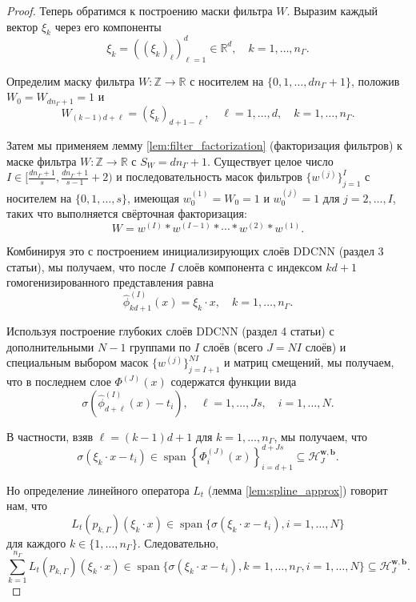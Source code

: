 \documentclass[../NDCNNAI_main.tex]{subfiles}
\begin{document}
\begin{proof}
    Теперь обратимся к построению маски фильтра $W$. Выразим каждый вектор $\xi_k$ через его компоненты
    \[
    \xi_k = ((\xi_k)_\ell)_{\ell=1}^d \in \mathbb{R}^d, \quad k = 1, \ldots, n_\Gamma.
    \]

    Определим маску фильтра $W : \mathbb{Z} \to \mathbb{R}$ с носителем на $\{0, 1, \ldots, dn_\Gamma + 1\}$, положив $W_0 = W_{dn_\Gamma + 1} = 1$ и
    \[
    W_{(k-1)d+\ell} = (\xi_k)_{d+1-\ell}, \quad \ell = 1, \ldots, d, \quad k = 1, \ldots, n_\Gamma.
    \]

    Затем мы применяем лемму \ref{lem:filter_factorization} (факторизация фильтров) к маске фильтра $W : \mathbb{Z} \to \mathbb{R}$ с $S_W = dn_\Gamma + 1$. Существует целое число $I \in [\frac{dn_\Gamma + 1}{s}, \frac{dn_\Gamma + 1}{s-1} + 2)$ и последовательность масок фильтров $\{w^{(j)}\}_{j=1}^I$ с носителем на $\{0, 1, \ldots, s\}$, имеющая $w_0^{(1)} = W_0 = 1$ и $w_0^{(j)} = 1$ для $j = 2, \ldots, I$, таких что выполняется свёрточная факторизация:
    \[
    W = w^{(I)} * w^{(I-1)} * \cdots * w^{(2)} * w^{(1)}.
    \]

    Комбинируя это с построением инициализирующих слоёв DDCNN (раздел 3 статьи), мы получаем, что после $I$ слоёв компонента с индексом $kd+1$ гомогенизированного представления равна
    \[
    \hat{\phi}_{kd+1}^{(I)}(x) = \xi_k \cdot x, \quad k = 1, \ldots, n_\Gamma.
    \]

    Используя построение глубоких слоёв DDCNN (раздел 4 статьи) с дополнительными $N-1$ группами по $I$ слоёв (всего $J = NI$ слоёв) и специальным выбором масок $\{w^{(j)}\}_{j=I+1}^{NI}$ и матриц смещений, мы получаем, что в последнем слое $\Phi^{(J)}(x)$ содержатся функции вида
    \[
    \sigma\left(\hat{\phi}_{d+\ell}^{(I)}(x) - t_i\right), \quad \ell = 1, \ldots, Js, \quad i = 1, \ldots, N.
    \]

    В частности, взяв $\ell = (k-1)d + 1$ для $k = 1, \ldots, n_\Gamma$, мы получаем, что
    \[
    \sigma(\xi_k \cdot x - t_i) \in \operatorname{span} \left\{ \Phi_i^{(J)}(x) \right\}_{i=d+1}^{d+Js} \subseteq \mathcal{H}_J^{\mathbf{w},\mathbf{b}}.
    \]

    Но определение линейного оператора $L_t$ (лемма \ref{lem:spline_approx}) говорит нам, что
    \[
    L_t(p_{k,\Gamma})(\xi_k \cdot x) \in \operatorname{span} \{\sigma(\xi_k \cdot x - t_i), i = 1, \ldots, N\}
    \]
    для каждого $k \in \{1, \ldots, n_\Gamma\}$. Следовательно,
    \[
    \sum_{k=1}^{n_\Gamma} L_t(p_{k,\Gamma})(\xi_k \cdot x) \in \operatorname{span} \{\sigma(\xi_k \cdot x - t_i), k = 1, \ldots, n_\Gamma, i = 1, \ldots, N\} \subseteq \mathcal{H}_J^{\mathbf{w},\mathbf{b}}.
    \]


\end{proof}
\end{document}
